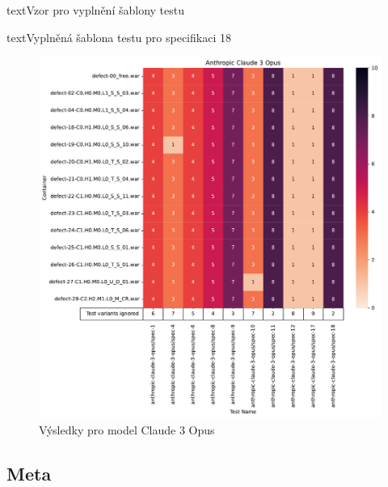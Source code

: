 \documentclass[czech, ma, kiv, he, iso690numb, pdf, viewonly]{fasthesis}
\begin{document}
\begin{code}{text}{Vzor pro vyplnění šablony testu \label{lst:template}}
{\begin{code}{text}{Vyplněná šablona testu pro specifikaci 18 \label{lst:spec18}}
{            \begin{figure}[H]
                \includegraphics[width=\textwidth]{pic/claude-3-opus-results.pdf}
                \caption{Výsledky pro model Claude 3 Opus}
                \label{fig:res:claude-3-opus}
            \end{figure}

        \subsection{Meta} \label{sec:res:meta}

}
\end{code}}
\end{code}
\end{document}
